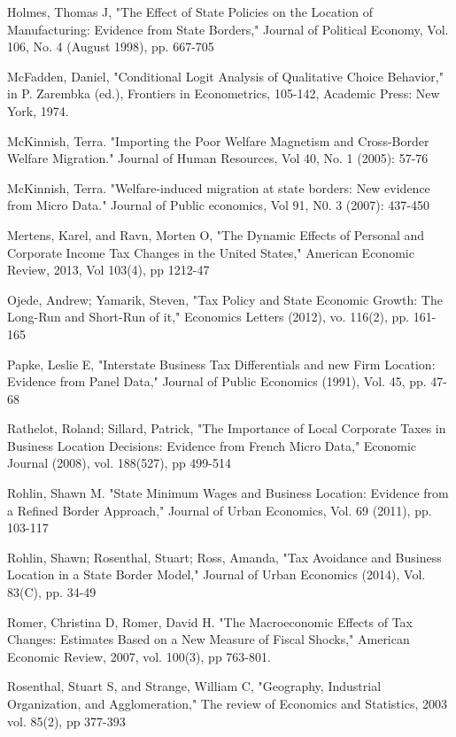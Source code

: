 \documentclass[12pt,a4paper]{article}
\begin{document}
\begin{thebibliography}{99}
Holmes, Thomas J, "The Effect of State Policies on the Location of Manufacturing: Evidence from State Borders," Journal of Political Economy, Vol. 106, No. 4 (August 1998), pp. 667-705

McFadden, Daniel, "Conditional Logit Analysis of Qualitative Choice Behavior," in P. Zarembka (ed.), Frontiers in Econometrics, 105-142, Academic Press: New York, 1974.

McKinnish, Terra. "Importing the Poor Welfare Magnetism and Cross-Border Welfare Migration." Journal of Human Resources, Vol 40, No. 1 (2005): 57-76

McKinnish, Terra. "Welfare-induced migration at state borders: New evidence from Micro Data." Journal of Public economics, Vol 91, N0. 3 (2007): 437-450

Mertens, Karel, and Ravn, Morten O, "The Dynamic Effects of Personal and Corporate Income Tax Changes in the United States," American Economic Review, 2013, Vol 103(4), pp 1212-47

Ojede, Andrew; Yamarik, Steven, "Tax Policy and State Economic Growth: The Long-Run and Short-Run of it," Economics Letters (2012), vo. 116(2), pp. 161-165

Papke, Leslie E, "Interstate Business Tax Differentials and new Firm Location: Evidence from Panel Data," Journal of Public Economics (1991), Vol. 45, pp. 47-68

Rathelot, Roland; Sillard, Patrick, "The Importance of Local Corporate Taxes in Business Location Decisions: Evidence from French Micro Data," Economic Journal (2008), vol. 188(527), pp 499-514

Rohlin, Shawn M. "State Minimum Wages and Business Location: Evidence from a Refined Border Approach," Journal of Urban Economics, Vol. 69 (2011), pp. 103-117

Rohlin, Shawn; Rosenthal, Stuart; Ross, Amanda, "Tax Avoidance and Business Location in a State Border Model," Journal of Urban Economics (2014), Vol. 83(C), pp. 34-49

Romer, Christina D, Romer, David H. "The Macroeconomic Effects of Tax Changes: Estimates Based on a New Measure of Fiscal Shocks," American Economic Review, 2007, vol. 100(3), pp 763-801.

Rosenthal, Stuart S, and Strange, William C, "Geography, Industrial Organization, and Agglomeration," The review of Economics and Statistics, 2003 vol. 85(2), pp 377-393


\end{thebibliography}
\end{document}
